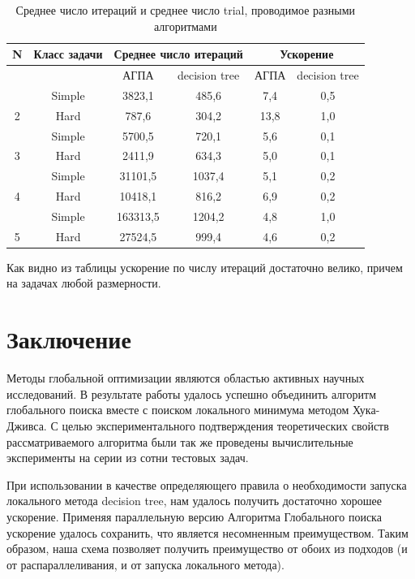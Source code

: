 \documentclass{svproc}
\begin{document}
\begin{table}[h!]
	\caption{Среднее число итераций и среднее число trial, проводимое разными алгоритмами}
	\label{tab:2}
	\centering
	\begin{tabular}{|c|c|c|c|c|c|}
		\hline
		
		N & Класс задачи & \multicolumn{2}{c|}{Среднее число итераций} & \multicolumn{2}{c|}{Ускорение} \\ \hline
		& ~ & АГПА & decision tree & АГПА & decision tree \\ \hline
		& Simple & 3823,1   & 485,6  & 7,4   & 0,5 \\ \hline
		2  & Hard & 787,6    & 304,2  & 13,8  & 1,0 \\ \hline
		& Simple & 5700,5   & 720,1  & 5,6   & 0,1 \\ \hline
		3  & Hard & 2411,9   & 634,3  & 5,0   & 0,1 \\ \hline
		& Simple & 31101,5  & 1037,4 & 5,1   & 0,2 \\ \hline
		4  & Hard & 10418,1  & 816,2  & 6,9   & 0,2 \\ \hline
		& Simple & 163313,5 & 1204,2 & 4,8   & 1,0 \\ \hline
		5  & Hard & 27524,5  & 999,4  & 4,6   & 0,2 \\ \hline
	\end{tabular}
\end{table}

Как видно из таблицы ускорение по числу итераций достаточно велико, причем на задачах любой размерности. 

\section{Заключение}\label{SecC}

Методы глобальной оптимизации являются областью активных научных исследований.  В результате работы удалось успешно объединить алгоритм глобального поиска вместе с поиском локального минимума методом Хука-Дживса. С целью экспериментального подтверждения теоретических свойств рассматриваемого алгоритма были так же проведены вычислительные эксперименты на серии из сотни тестовых задач. 

При использовании в качестве определяющего правила о необходимости запуска локального метода decision tree, нам удалось получить достаточно хорошее ускорение. Применяя параллельную версию Алгоритма Глобального поиска ускорение удалось сохранить, что является несомненным преимуществом. Таким образом, наша схема позволяет получить преимущество от обоих из подходов (и от распараллеливания, и от запуска локального метода).
\end{document}
